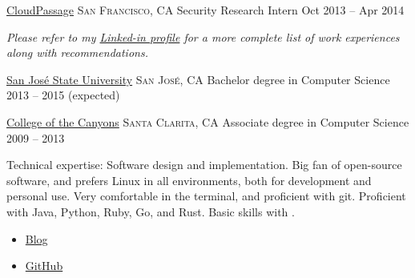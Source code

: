 \documentclass[10pt]{article}
\begin{document}
\headedsection  %
  {\href{http://www.cloudpassage.com}{CloudPassage}}
  {\textsc{San Francisco, CA}} {%
  \headedsubsection
    {Security Research Intern}
    {Oct 2013 -- Apr 2014}
    {}
}

\vspace{-0.2em}
\begin{center}
  \emph{\small Please refer to my \href{http://www.linkedin.com/in/skylerhawthorne}{Linked-in profile} for a more complete list of work experiences along with recommendations.}
\end{center}


\spacedhrule{-0.2em}{-0.4em}


\headedsection
  {\href{http://www.sjsu.edu/}{San Jos\'{e} State University}}
  {\textsc{San Jos\'{e}, CA}} {%
  \headedsubsection
    {Bachelor degree in Computer Science}
    {2013 -- 2015 (expected)}
    {}
}

\headedsection
  {\href{http://www.canyons.edu/}{College of the Canyons}}
  {\textsc{Santa Clarita, CA}} {%
  \headedsubsection
    {Associate degree in Computer Science}
    {2009 -- 2013} {}
}

\spacedhrule{0.5em}{-0.4em}


\inlineheadsection  %
  {Technical expertise:}
  {Software design and implementation. Big fan of open-source software, and prefers Linux in all environments, both for development and personal use. Very comfortable in the terminal, and proficient with git. Proficient with Java, Python, Ruby, Go, and Rust. Basic skills with \CPP.}

\pagebreak

\begin{itemize}
	\item{\href{http://dead10ck.github.io/}{Blog}}
	\item{\href{https://github.com/dead10ck}{GitHub}}
\end{itemize}
\end{document}
